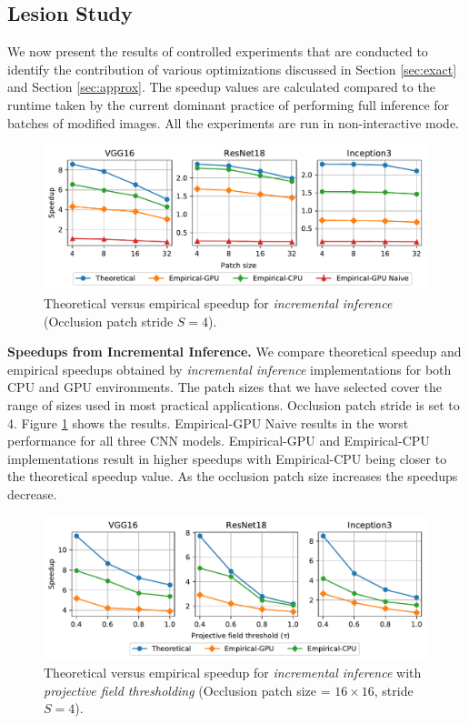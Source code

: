 \subsection{Lesion Study}
We now present the results of controlled experiments that are conducted to identify the contribution of various optimizations discussed in Section \ref{sec:exact} and Section \ref{sec:approx}.
The speedup values are calculated compared to the runtime taken by the current dominant practice of performing full inference for batches of modified images.
All the experiments are run in non-interactive mode.

\begin{figure}[t]
\includegraphics[width=\columnwidth]{images/5_2_1_edited}
\caption{Theoretical versus empirical speedup for \textit{incremental inference} (Occlusion patch stride $S=4$).}
\label{fig:5_2_1_edited}
\end{figure}

\vspace{2mm}
\noindent \textbf{Speedups from Incremental Inference.} We compare theoretical speedup and empirical speedups obtained by \textit{incremental inference} implementations for both CPU and GPU environments.
The patch sizes that we have selected cover the range of sizes used in most practical applications.
Occlusion patch stride is set to 4.
Figure \ref{fig:5_2_1_edited} shows the results.
Empirical-GPU Naive results in the worst performance for all three CNN models.
Empirical-GPU and Empirical-CPU implementations result in higher speedups with Empirical-CPU being closer to the theoretical speedup value.
As the occlusion patch size increases the speedups decrease.


\begin{figure}[t]
\includegraphics[width=\columnwidth]{images/5_2_2_edited}
\caption{Theoretical versus empirical speedup for \textit{incremental inference} with \textit{projective field thresholding} (Occlusion patch size = $16 \times 16$, stride $S=4$).}
\label{fig:5_2_2_edited}
\end{figure}

